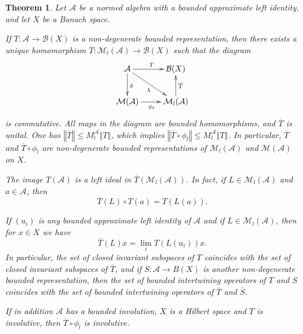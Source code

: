 \documentclass{amsart}
\theoremstyle{plain}
\newtheorem{theorem}{Theorem}[section]
\theoremstyle{definition}
\numberwithin{equation}{section}
\begin{document}
\begin{theorem}\label{t:summary_for_centralizers}
Let $\mathcal{A}$ be a normed algebra with a bounded approximate left identity, and let $X$ be a Banach space.

If $T: \mathcal{A} \to \mathcal B(X)$ is a non-degenerate bounded representation, then there exists a unique homomorphism $\overline{T}: {{\mathcal M}_l(\mathcal A)} \to \mathcal B(X)$ such that the diagram
\begin{equation}\label{diag:left_centralizer_diagram}
\xymatrix{
\mathcal{A} \ar[r]^T \ar[rd]_{\lambda} \ar[d]^\delta & \mathcal B(X) \\
{{\mathcal M}(\mathcal A)} \ar[r]_{\phi_l} & {{\mathcal M}_l(\mathcal A)} \ar[u]_{\overline{T}}
}
\end{equation}
is commutative. All maps in the diagram are bounded homomorphisms, and $\overline{T}$ is unital. One has ${\left\Vert {\overline{T}} \right\Vert} \leq M_l^{\mathcal A} {\left\Vert {T} \right\Vert}$, which implies ${\left\Vert {\overline{T} \circ \phi_l} \right\Vert} \leq M_l^{\mathcal A} {\left\Vert {T} \right\Vert}$. In particular, $\overline{T}$ and $\overline{T} \circ \phi_l$ are non-degenerate bounded representations of ${{\mathcal M}_l(\mathcal A)}$ and ${{\mathcal M}(\mathcal A)}$ on $X$.

The image $T(\mathcal{A})$ is a left ideal in $\overline{T}({{\mathcal M}_l(\mathcal A)})$. In fact, if $L \in {{\mathcal M}_l(\mathcal A)}$ and $a \in \mathcal{A}$, then
\begin{equation}\label{e:compatibility}
\overline{T}(L) \circ T(a) = T(L(a)).
\end{equation}

If $(u_i)$ is any bounded approximate left identity of $\mathcal{A}$ and if $L\in{{\mathcal M}_l(\mathcal A)}$, then for $x \in X$ we have
\begin{equation}\label{e:extension_as_sot_limit}
\overline{T}(L)x = \lim_i T(L(u_i))x.
\end{equation}
In particular, the set of closed invariant subspaces of $T$ coincides with the set of closed invariant subspaces of $\overline{T}$, and if $S: \mathcal{A} \to B(X)$ is another non-degenerate bounded representation, then the set of bounded intertwining operators of $T$ and $S$ coincides with the set of bounded intertwining operators of $\overline{T}$ and $\overline{S}$.

If in addition $\mathcal{A}$ has a bounded involution, $X$ is a Hilbert space and $T$ is involutive, then $\overline{T} \circ \phi_l$ is involutive.
\end{theorem}
\end{document}

